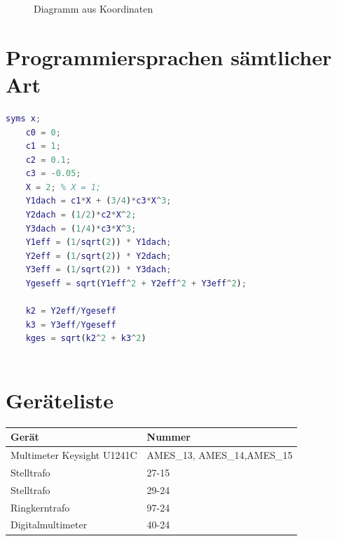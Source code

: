 \resetlaborsectioncounter
{}
\begin{figure}[H]
	\centering
	\caption{Diagramm aus Koordinaten}
	\label{fig:2_2_diagramm}
\end{figure}


\newpage
\section{Programmiersprachen sämtlicher Art}
\begin{lstlisting}[language=matlab]
	syms x;
	c0 = 0;
	c1 = 1;
	c2 = 0.1;
	c3 = -0.05;
	X = 2; % X = 1;
	Y1dach = c1*X + (3/4)*c3*X^3;
	Y2dach = (1/2)*c2*X^2;
	Y3dach = (1/4)*c3*X^3;
	Y1eff = (1/sqrt(2)) * Y1dach;
	Y2eff = (1/sqrt(2)) * Y2dach;
	Y3eff = (1/sqrt(2)) * Y3dach;
	Ygeseff = sqrt(Y1eff^2 + Y2eff^2 + Y3eff^2);
	
	k2 = Y2eff/Ygeseff
	k3 = Y3eff/Ygeseff
	kges = sqrt(k2^2 + k3^2)
	
\end{lstlisting}

\printbibliography






\newpage
\section*{Geräteliste}
\begin{table} [H]
	\begin{tabular}{|l|l|}
		\hline
		\textbf{Gerät }            & \textbf{Nummer }            \\ \hline
		Multimeter Keysight U1241C & AMES\_13, AMES\_14,AMES\_15 \\ \hline
		Stelltrafo                 & 27-15                       \\ \hline
		Stelltrafo                 & 29-24                       \\ \hline
		Ringkerntrafo              & 97-24                       \\ \hline
		Digitalmultimeter          & 40-24                       \\ \hline
	\end{tabular}
\end{table}



